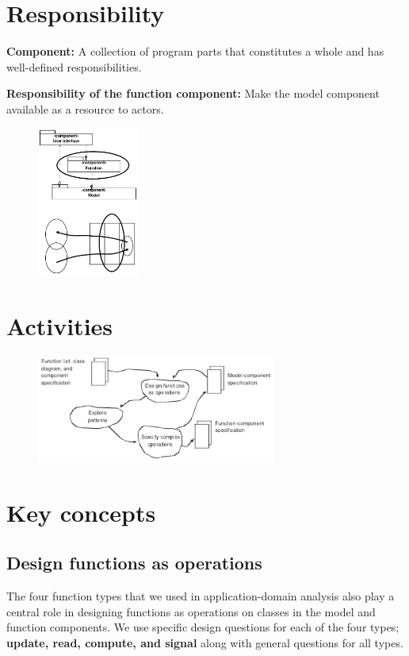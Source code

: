\section{Responsibility}
\textbf{Component:} A collection of program parts that constitutes a whole and has well-defined responsibilities.

\noindent \textbf{Responsibility of the function component:} Make the model component available as a resource to actors.

\begin{figure}[H]
    \centering
    \includegraphics[width=0.3\textwidth]{figures/functioncomponentresponsibility.png}
\end{figure}

\section{Activities}

\begin{figure}[H]
    \centering
    \includegraphics[width=0.7\textwidth]{figures/functioncomponentactivities.png}
\end{figure}

\section{Key concepts}

\subsection{Design functions as operations}
The four function types that we used in application-domain analysis also play a central role in designing functions as operations on classes in the model and function components. We use specific design questions for each of the four types; \textbf{update, read, compute, and signal} along with general questions for all types.

